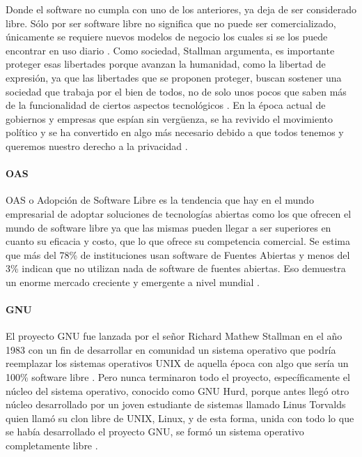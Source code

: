 
Donde el software no cumpla con uno de los anteriores, ya deja de ser considerado libre. Sólo por ser software libre no significa que no puede ser comercializado, únicamente se requiere nuevos modelos de negocio los cuales si se los puede encontrar en uso diario \citep{GNU-Free-Software}. Como sociedad, Stallman argumenta, es importante proteger esas libertades porque avanzan la humanidad, como la libertad de expresión, ya que las libertades que se proponen proteger, buscan sostener una sociedad que trabaja por el bien de todos, no de solo unos pocos que saben más de la funcionalidad de ciertos aspectos tecnológicos \citep{GNU-Open-vs-Free}. En la época actual de gobiernos y empresas que espían sin vergüenza, se ha revivido el movimiento político y se ha convertido en algo más necesario debido a que todos tenemos y  queremos nuestro derecho a la privacidad \citep{GNU-Freedom}.


\paragraph{OAS}
OAS o Adopción de Software Libre es la tendencia que hay en el mundo empresarial de adoptar soluciones de tecnologías abiertas como los que ofrecen el mundo de software libre ya que las mismas pueden llegar a ser superiores en cuanto su eficacia y costo, que lo que ofrece su competencia comercial. Se estima que más del 78\% de instituciones usan software  de Fuentes Abiertas y menos del 3\% indican que no utilizan nada de software de fuentes abiertas. Eso demuestra un enorme mercado creciente y emergente a nivel mundial \citep{ACCEL-OAS}.

\paragraph{GNU}
El proyecto GNU fue lanzada por el señor Richard Mathew Stallman en el año 1983 con un fin de desarrollar en comunidad un sistema operativo que podría reemplazar los sistemas operativos UNIX de aquella época con algo que sería un 100\% software libre \citep{GNU-GNU-OS}. Pero nunca terminaron todo el proyecto, específicamente el núcleo del sistema operativo, conocido como GNU Hurd, porque antes llegó otro núcleo desarrollado por un joven estudiante de sistemas llamado Linus Torvalds quien llamó su clon libre de UNIX, Linux, y de esta forma, unida con todo lo que se había desarrollado el proyecto GNU, se formó un sistema operativo completamente libre \citep{GNU-GNU-Linux}.

